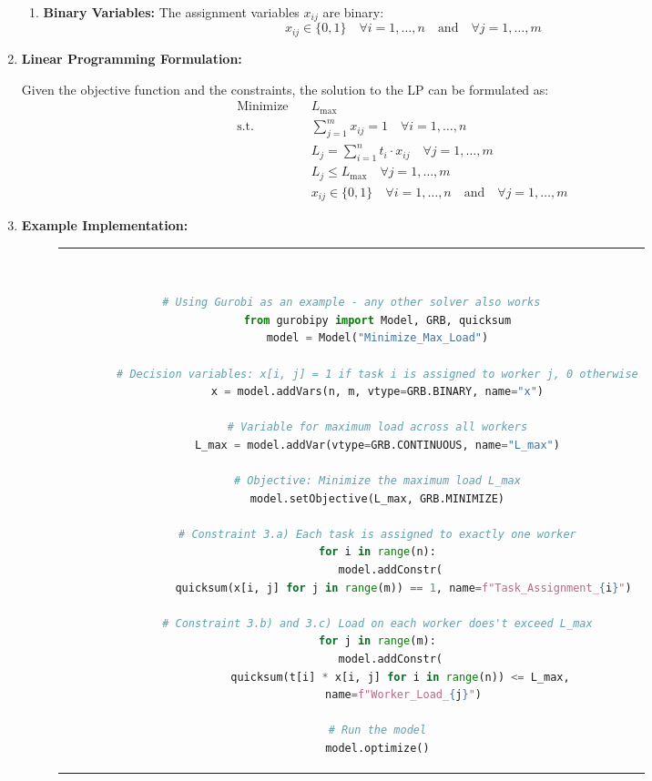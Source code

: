 \begin{enumerate}
\begin{enumerate}
    \item \textbf{Binary Variables:} The assignment variables \( x_{ij} \) are binary:
    \begin{equation}
    x_{ij} \in \{0, 1\} \quad \forall i = 1, \dots, n \quad \text{and} \quad \forall j = 1, \dots, m
    \end{equation}
\end{enumerate}

\item \textbf{Linear Programming Formulation:}

Given the objective function and the constraints, the solution to the \ac{LP} can be formulated as:
\begin{align}
\text{Minimize} \quad & L_{\text{max}} \\
\text{s.t.} \quad & \sum_{j=1}^{m} x_{ij} = 1 \quad \forall i = 1, \dots, n \\
& L_j = \sum_{i=1}^{n} t_i \cdot x_{ij} \quad \forall j = 1, \dots, m \\
& L_j \leq L_{\text{max}} \quad \forall j = 1, \dots, m \\
& x_{ij} \in \{0, 1\} \quad \forall i = 1, \dots, n \quad \text{and} \quad \forall j = 1, \dots, m
\end{align}
\item \textbf{Example Implementation:} 

    \begin{figure}[htpb]
      \begin{tabular}{c}
      \ \small \begin{lstlisting}[language=Python]
        # Using Gurobi as an example - any other solver also works
        from gurobipy import Model, GRB, quicksum
        model = Model("Minimize_Max_Load")
        
        # Decision variables: x[i, j] = 1 if task i is assigned to worker j, 0 otherwise
        x = model.addVars(n, m, vtype=GRB.BINARY, name="x")
        
        # Variable for maximum load across all workers
        L_max = model.addVar(vtype=GRB.CONTINUOUS, name="L_max")
        
        # Objective: Minimize the maximum load L_max
        model.setObjective(L_max, GRB.MINIMIZE)
        
        # Constraint 3.a) Each task is assigned to exactly one worker
        for i in range(n):
            model.addConstr(
                quicksum(x[i, j] for j in range(m)) == 1, name=f"Task_Assignment_{i}")
        
        # Constraint 3.b) and 3.c) Load on each worker does't exceed L_max
        for j in range(m):
            model.addConstr(
                quicksum(t[i] * x[i, j] for i in range(n)) <= L_max, 
                name=f"Worker_Load_{j}")
        
        # Run the model
        model.optimize()
        \end{lstlisting}
      \end{tabular}
      \label{fig:lp-optimization}
    \end{figure}

\end{enumerate}
